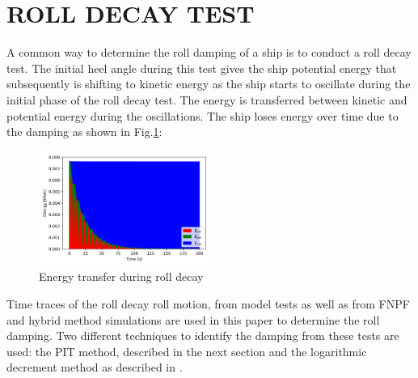 \section*{ROLL DECAY TEST}\label{roll-decay-test}
A common way to determine the roll damping of a ship is to conduct a
roll decay test. The initial heel angle during this test gives the ship
potential energy that subsequently is shifting to kinetic energy as the
ship starts to oscillate during the initial phase of the roll decay
test. The energy is transferred between kinetic and potential energy
during the oscillations. The ship loses energy over time due to the
damping as shown in Fig.\ref{fig:energy}:
\begin{figure}[H]
\begin{center}\includegraphics[width = 0.5\textwidth]{figures/energy.png}\end{center}
\vspace{-1cm}
\caption{Energy transfer during roll decay}
\label{fig:energy}
\end{figure}
Time traces of the roll decay roll motion, from model tests as well as
from FNPF and hybrid method simulations are used in this paper to
determine the roll damping. Two different techniques to identify the
damping from these tests are used: the PIT method, described in the next
section and the logarithmic decrement method as described in
\citep{7505983/BYNJ8CFG}.

